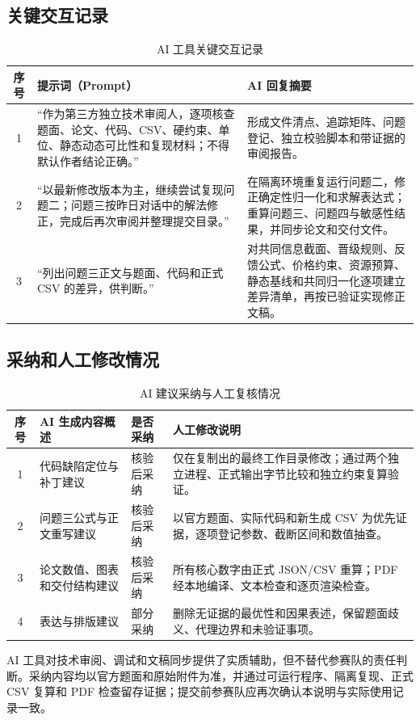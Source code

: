 \subsection*{关键交互记录}
\begin{table}[H]
\centering
\caption{AI 工具关键交互记录}
\begin{tabular}{cp{}p{}}
\toprule
序号 & 提示词（Prompt） & AI 回复摘要 \\
\midrule
1 & “作为第三方独立技术审阅人，逐项核查题面、论文、代码、CSV、硬约束、单位、静态动态可比性和复现材料；不得默认作者结论正确。” & 形成文件清点、追踪矩阵、问题登记、独立校验脚本和带证据的审阅报告。 \\
2 & “以最新修改版本为主，继续尝试复现问题二；问题三按昨日对话中的解法修正，完成后再次审阅并整理提交目录。” & 在隔离环境重复运行问题二，修正确定性归一化和求解表达式；重算问题三、问题四与敏感性结果，并同步论文和交付文件。 \\
3 & “列出问题三正文与题面、代码和正式 CSV 的差异，供判断。” & 对共同信息截面、晋级规则、反馈公式、价格约束、资源预算、静态基线和共同归一化逐项建立差异清单，再按已验证实现修正文稿。 \\
\bottomrule
\end{tabular}
\end{table}

\subsection*{采纳和人工修改情况}
\begin{table}[H]
\centering
\caption{AI 建议采纳与人工复核情况}
\begin{tabularx}{\textwidth}{cp{}p{}X}
\toprule
序号 & AI 生成内容概述 & 是否采纳 & 人工修改说明 \\
\midrule
1 & 代码缺陷定位与补丁建议 & 核验后采纳 & 仅在复制出的最终工作目录修改；通过两个独立进程、正式输出字节比较和独立约束复算验证。 \\
2 & 问题三公式与正文重写建议 & 核验后采纳 & 以官方题面、实际代码和新生成 CSV 为优先证据，逐项登记参数、截断区间和数值抽查。 \\
3 & 论文数值、图表和交付结构建议 & 核验后采纳 & 所有核心数字由正式 JSON/CSV 重算；PDF 经本地编译、文本检查和逐页渲染检查。 \\
4 & 表达与排版建议 & 部分采纳 & 删除无证据的最优性和因果表述，保留题面歧义、代理边界和未验证事项。 \\
\bottomrule
\end{tabularx}
\end{table}

AI 工具对技术审阅、调试和文稿同步提供了实质辅助，但不替代参赛队的责任判断。采纳内容均以官方题面和原始附件为准，并通过可运行程序、隔离复现、正式 CSV 复算和 PDF 检查留存证据；提交前参赛队应再次确认本说明与实际使用记录一致。
